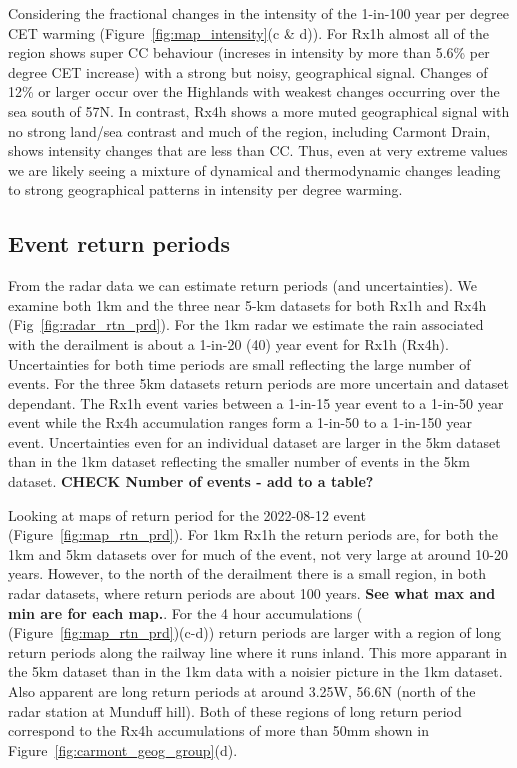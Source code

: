 \documentclass[11pt,a4paper]{article}
\begin{document}
Considering the fractional changes in the intensity of the 1-in-100 year per degree CET warming (Figure~\ref{fig:map_intensity}(c \& d)). For Rx1h almost all of the region shows super CC behaviour (increses in intensity by more than 5.6\% per degree CET increase) with a strong but noisy,  geographical signal.  Changes of 12\% or larger occur over the Highlands with weakest changes occurring over the sea south of 57N. In contrast, Rx4h shows a  more muted geographical signal with no strong land/sea contrast and much of the region, including Carmont Drain, shows intensity changes that are less than CC.  Thus, even at very extreme values we are likely seeing a mixture of dynamical and thermodynamic  changes leading to  strong geographical patterns in  intensity per degree warming.

\subsection{Event return periods}
From the radar data we can estimate return periods (and uncertainties). We examine both 1km and the three near 5-km datasets for both Rx1h and Rx4h (Fig~\ref{fig:radar_rtn_prd}). For the 1km radar we estimate the rain associated with the derailment is about a 1-in-20 (40) year event for Rx1h (Rx4h). Uncertainties for both time periods are small reflecting the large number of events. For the three 5km datasets return periods are more uncertain and dataset dependant. The Rx1h event varies between a 1-in-15 year event to a 1-in-50 year event while the Rx4h accumulation ranges form a 1-in-50 to a 1-in-150 year event. Uncertainties even for an individual dataset are larger in the 5km dataset than in the 1km dataset reflecting the smaller number of events in the 5km dataset. \textbf{CHECK Number of events - add to a table?}

Looking at maps of return period for the 2022-08-12 event (Figure~\ref{fig:map_rtn_prd}). For 1km Rx1h the return periods are, for both the 1km and 5km datasets over for much of the event, not very large at around 10-20 years. However,  to the north of the derailment there is a small region, in both radar datasets, where return periods are about 100 years.  \textbf{See what max and min are for each map.}.  For the 4 hour accumulations ( (Figure~\ref{fig:map_rtn_prd})(c-d)) return periods are larger with a region of long return periods along the railway line where it runs inland. This more apparant in the 5km dataset than in the 1km data with a noisier picture in the 1km dataset. Also apparent are long return periods at around 3.25W, 56.6N (north of the radar station at Munduff hill). Both of these regions of long return period correspond to the Rx4h accumulations of more than 50mm shown in Figure~\ref{fig:carmont_geog_group}(d). 
\end{document}
